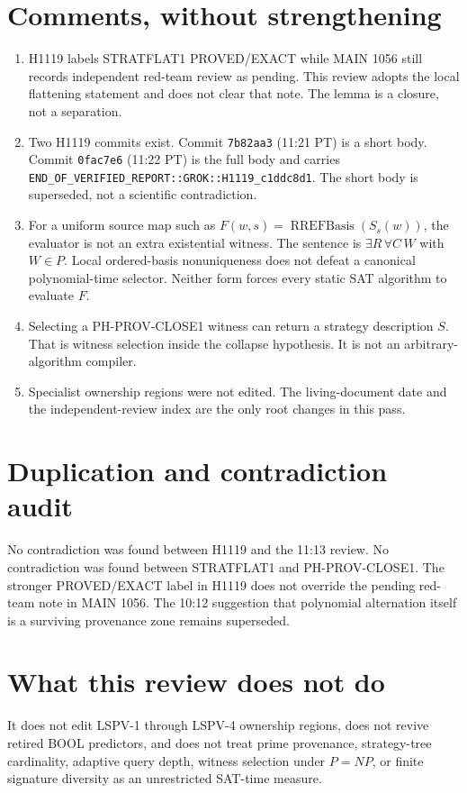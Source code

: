 \documentclass[11pt]{article}
\begin{document}
\section*{Comments, without strengthening}
\begin{enumerate}
\item H1119 labels STRATFLAT1 PROVED/EXACT while MAIN 1056 still records independent
red-team review as pending. This review adopts the local flattening statement and does not
clear that note. The lemma is a closure, not a separation.
\item Two H1119 commits exist. Commit \texttt{7b82aa3} (11:21 PT) is a short body.
Commit \texttt{0fac7e6} (11:22 PT) is the full body and carries
\texttt{END\_OF\_VERIFIED\_REPORT::GROK::H1119\_c1ddc8d1}. The short body is superseded,
not a scientific contradiction.
\item For a uniform source map such as \(F(w,s)=\operatorname{RREFBasis}(S_s(w))\), the
evaluator is not an extra existential witness. The sentence is \(\exists R\,\forall C\,W\)
with \(W\in P\). Local ordered-basis nonuniqueness does not defeat a canonical polynomial-time
selector. Neither form forces every static SAT algorithm to evaluate \(F\).
\item Selecting a PH-PROV-CLOSE1 witness can return a strategy description \(S\). That is
witness selection inside the collapse hypothesis. It is not an arbitrary-algorithm compiler.
\item Specialist ownership regions were not edited. The living-document date and the
independent-review index are the only root changes in this pass.
\end{enumerate}

\section*{Duplication and contradiction audit}
No contradiction was found between H1119 and the 11:13 review. No contradiction was found
between STRATFLAT1 and PH-PROV-CLOSE1. The stronger PROVED/EXACT label in H1119 does not
override the pending red-team note in MAIN 1056. The 10:12 suggestion that polynomial
alternation itself is a surviving provenance zone remains superseded.

\section*{What this review does not do}
It does not edit LSPV-1 through LSPV-4 ownership regions, does not revive retired BOOL
predictors, and does not treat prime provenance, strategy-tree cardinality, adaptive query
depth, witness selection under \(P=NP\), or finite signature diversity as an unrestricted
SAT-time measure.
\end{document}
